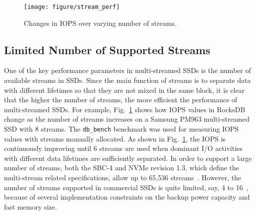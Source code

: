 \begin{figure}[t]
	\centering
	\texttt{[image: figure/stream\_perf]}
	\vspace{-9pt}
	\caption{Changes in IOPS over varying number of streams.} 
	\label{fig:stream_perf}
	\vspace{-15pt}
\end{figure}

\vspace{-10pt}
\subsection{Limited Number of Supported Streams}
One of the key performance parameters in multi-streamed SSDs is the number of 
available streams in SSDs.  
Since the main function of  streams is to separate data with different lifetimes 
so that they are not mixed in the same block, it is clear that the 
higher the number of streams, the more efficient the performance of multi-streamed SSDs.
For example, Fig.~\ref{fig:stream_perf} shows how IOPS values in RocksDB
change as the number of streams increases on a Samsung PM963 multi-streamed SSD
with 8 streams.
The \texttt{db\_bench} benchmark was used for measuring IOPS values with streams
manually allocated.
As shown in Fig.~\ref{fig:stream_perf}, the IOPS is continuously improving
until 6 streams are used when dominant I/O activities with different data lifetimes
are sufficiently separated.
In order to support a large number of streams, both the SBC-4 and NVMe revision 1.3, which define the 
multi-stream related specifications, allow up to 65,536 streams~\cite{T10, NVMe}.  
However, the number of streams supported in
commercial SSDs is quite limited, say, 4 to 16~\cite{MultiStream, Level, AutoStream}, 
because of several implementation constraints on the backup power capacity and fast memory size.


